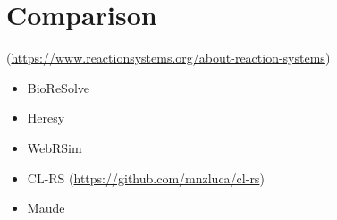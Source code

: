 
\section{Comparison}
(\url{https://www.reactionsystems.org/about-reaction-systems})
\begin{itemize}
\item BioReSolve
\item Heresy
\item WebRSim
\item CL-RS (\url{https://github.com/mnzluca/cl-rs})
\item Maude
\end{itemize}
